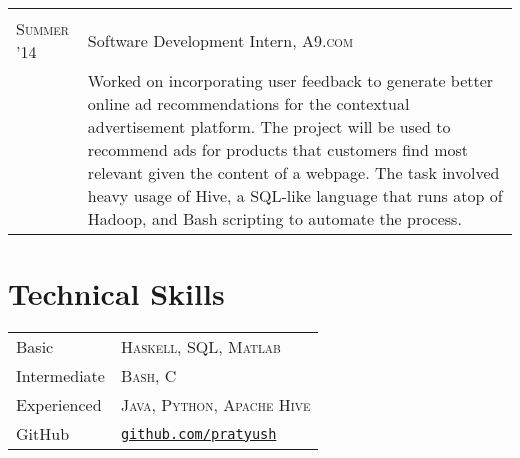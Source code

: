 \documentclass[10pt]{article}
\begin{document}
\begin{tabular}{R{2.5cm}p{13cm}}
{                            }\\

  \textsc{Summer '14}     & Software Development Intern, \textsc{A9.com}\\

                          &\footnotesize{%
                             Worked on incorporating user feedback to generate
                             better online ad recommendations for the
                             contextual advertisement platform. The project
                             will be used to recommend ads for products that
                             customers find most relevant given the content of
                             a webpage. The task involved heavy usage of Hive,
                             a SQL-like language that runs atop of Hadoop, and
                             Bash scripting to automate the process.
                            }
\end{tabular}


\nocite{*}
\printbibliography{}

\section{Technical Skills}
\begin{tabular}{R{2.5cm}l}
  Basic         & \textsc{Haskell}, \textsc{SQL}, \textsc{Matlab}\\
  Intermediate  & \textsc{Bash, C}\\
  Experienced   & \textsc{Java, Python, Apache Hive}\\
  GitHub        & \href{https://www.github.com/pratyush}{\texttt{github.com/pratyush}}
\end{tabular}
\end{document}
